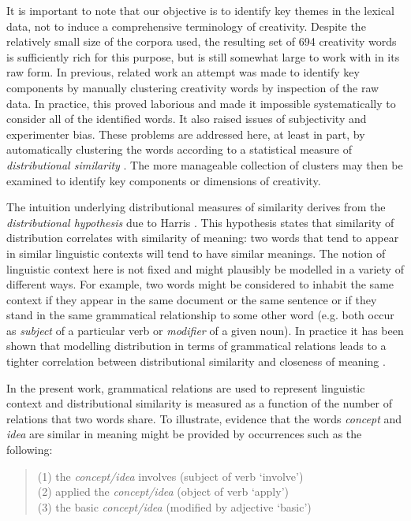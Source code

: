 \documentclass[10pt,letterpaper]{article}
\begin{document}
It is important to note that our objective is to identify key themes in the lexical data, not to induce a comprehensive terminology of creativity. Despite the relatively small size of the corpora used, the resulting set of 694 creativity words is sufficiently rich for this purpose, but is still somewhat large to work with in its raw form. In previous, related work \cite{jordanous10a} an attempt was made to identify key components by manually clustering creativity words by inspection of the raw data. In practice, this proved laborious and made it impossible systematically to consider all of the identified words. It also raised issues of subjectivity and experimenter bias. These problems are addressed here, at least in part, by automatically clustering the words according to a statistical measure of {\em distributional similarity\/} \cite{lin98}.  The more manageable collection of clusters may then be examined to identify key components or dimensions of creativity.

The intuition underlying distributional measures of similarity derives from the {\em distributional hypothesis\/} due to Harris \cite{harris68}. This hypothesis  states that similarity of distribution correlates with similarity of meaning: two words that tend to appear in similar linguistic contexts will tend to have similar meanings. The notion of linguistic context here is not fixed and might plausibly be modelled in a variety of different ways. For example, two words might be considered to inhabit the same context if they appear in the same document or the same sentence or if they stand in the same grammatical relationship to some other word (e.g. both occur as {\em subject\/} of a particular verb or {\em modifier\/} of a given noun). In practice it has been shown that modelling distribution in terms of grammatical relations leads to a tighter correlation between distributional similarity and closeness of meaning \cite{kilgarriff00}. 

In the present work, grammatical relations are used to represent linguistic context  and distributional similarity is measured as a function of the number of  relations 
that two words share. To illustrate, evidence that the words {\em concept} and {\em idea} are similar in meaning might be provided by occurrences such as the following: 

\begin{quote}
(1) the {\em concept/idea} involves \hfill (subject of verb `involve')\\
(2) applied the {\em concept/idea\/} \hfill (object of verb `apply') \\
(3) the basic {\em concept/idea\/} \hfill (modified by adjective `basic')
\end{quote}
\end{document}
